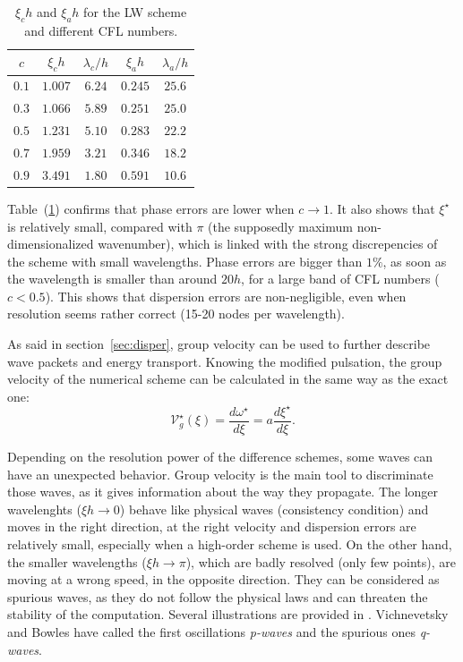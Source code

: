 \begin{table}[ht!]
\begin{center}
\begin{tabular}{c||c|c||c|c}
$c$ & $\xi_c h$ & $\lambda_c / h$ & $ \xi_a h$ & $\lambda_a / h$\\
\hline
$0.1$ & $1.007$ & $6.24$ & $0.245$ & $25.6$ \\
$0.3$ & $1.066$ & $5.89$ & $0.251$ & $25.0$ \\
$0.5$ & $1.231$ & $5.10$ & $0.283$ & $22.2$ \\
$0.7$ & $1.959$ & $3.21$ & $0.346$ & $18.2$ \\
$0.9$ & $\mathit{3.491}$ & $\mathit{1.80}$ & $0.591$ & $10.6$ \\
\end{tabular}
\end{center}
\caption{$\xi_c h$ and $\xi_a h$ for the LW scheme and different CFL numbers.}
\label{tab:kdx_lw}
\end{table}

\noindent Table~(\ref{tab:kdx_lw}) confirms that phase errors are lower when $c\rightarrow 1$. It also shows that $\xi^{\star}$ is relatively small, compared with $\pi$ (the supposedly maximum non-dimensionalized wavenumber), which is linked with the strong discrepencies of the scheme with small wavelengths. Phase errors are bigger than $1\%$, as soon as the wavelength is smaller than around $20 h$, for a large band of CFL numbers ($c<0.5$). This shows that dispersion errors are non-negligible, even when resolution seems rather correct (15-20 nodes per wavelength).

\vskip8mm

\noindent As said in section~\ref{sec:disper}, group velocity can be used to further describe wave packets and energy transport. Knowing the modified pulsation, the group velocity of the numerical scheme can be calculated in the same way as the exact one:
\begin{equation}
\label{eq:vgroup_star}
\mathcal{V}^{\star}_g (\xi) = \frac{d \omega^{\star}}{d\xi} = a \frac{d\xi^{\star}}{d\xi}.
\end{equation}

\noindent Depending on the resolution power of the difference schemes, some waves can have an unexpected behavior. Group velocity is the main tool to discriminate those waves, as it gives information about the way they propagate. The longer wavelenghts ($\xi h \rightarrow 0$) behave like physical waves (consistency condition) and moves in the right direction, at the right velocity and dispersion errors are relatively small, especially when a high-order scheme is used. On the other hand, the smaller wavelengths ($\xi h \rightarrow \pi$), which are badly resolved (only few points), are moving at a wrong speed, in the opposite direction. They can be considered as spurious waves, as they do not follow the physical laws and can threaten the stability of the computation. Several illustrations are provided in \cite{Trefethen:1982,Vichnevetsky:1982}. Vichnevetsky and Bowles \cite{Vichnevetsky:1982} have called the first oscillations {\it p-waves} and the spurious ones {\it q-waves}.

